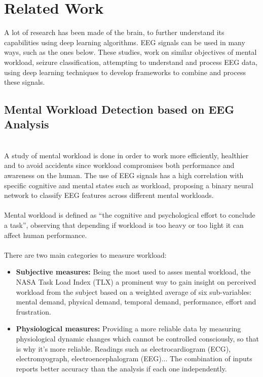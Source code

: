 \section{Related Work}
A lot of research has been made of the brain, to further understand its capabilities using deep learning algorithms. EEG signals can be used in many ways, such as the ones below. These studies, work on similar objectives of mental workload, seizure classification, attempting to understand and process EEG data, using deep learning techniques to develop frameworks to combine and process these signals.
\\
\subsection{Mental Workload Detection based on EEG Analysis}
\leavevmode\\ 
A study of mental workload\cite{relatedwork0} is done in order to work more efficiently, healthier and to avoid accidents since workload compromises both performance and awareness on the human. The use of EEG signals has a high correlation with specific cognitive and mental states such as workload, proposing a binary neural network to classify EEG features across different mental workloads.
\\\\
Mental workload is defined as “the cognitive and psychological effort to conclude a task”, observing that depending if workload is too heavy or too light it can affect human performance. 
\\\\
There are two main categories to measure workload:
\\
\begin{itemize}
\item \textbf{Subjective measures:} Being the most used to asses mental workload, the NASA Task Load Index (TLX)\cite{tlx} a prominent way to gain insight on perceived workload from the subject based on a weighted average of six sub-variables: mental demand, physical demand, temporal demand, performance, effort and frustration. 
\item \textbf{Physiological measures:} Providing a more reliable data by measuring physiological dynamic changes which cannot be controlled consciously, so that is why it’s more reliable. Readings such as electrocardiogram (ECG), electromyograph, electroencephalogram (EEG)... The combination of inputs reports better accuracy than the analysis if each one independently.
\end{itemize}

